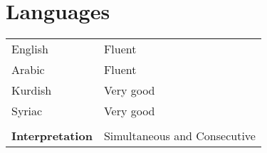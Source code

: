 \documentclass[11pt]{article}
\begin{document}
\section*{Languages}
\label{sec:org25107c0}


\begin{tabular}{p{10em}|l}
English & Fluent\\
Arabic & Fluent\\
Kurdish & Very good\\
Syriac & Very good\\
 & \\
\textbf{Interpretation} & Simultaneous and Consecutive\\
\end{tabular}
\end{document}
